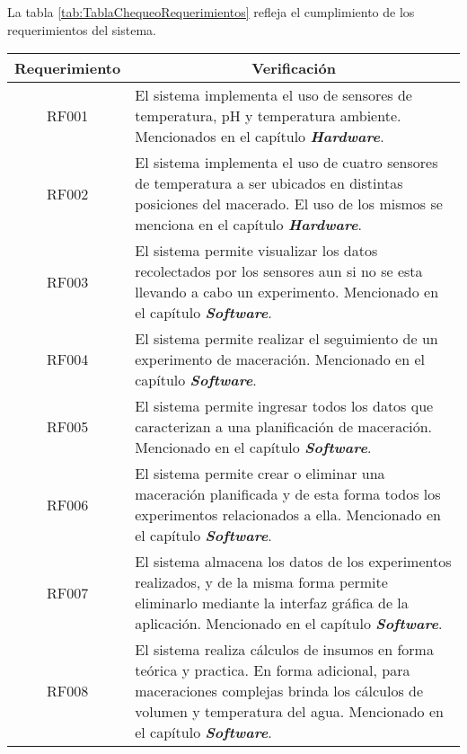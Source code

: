 \par La tabla \ref{tab:TablaChequeoRequerimientos} refleja el cumplimiento de los requerimientos del sistema.
 \begin{table}[h]
     \centering
     \begin{tabularx}{\textwidth}{|X|X|}
     \hline
     \multicolumn{1}{|c|}{Requerimiento} & \multicolumn{1}{|c|}{Verificación}\\
     \hline
     \hline
        \multicolumn{1}{|c|}{RF001}  & El sistema implementa el uso de sensores de temperatura, pH y temperatura ambiente. Mencionados en el capítulo \textit{\textbf{Hardware}}. \\
        \hline
        \multicolumn{1}{|c|}{RF002}  & El sistema implementa el uso de cuatro sensores de temperatura a ser ubicados en distintas posiciones del macerado. El uso de los mismos se menciona en el capítulo \textit{\textbf{Hardware}}. \\
        \hline
        \multicolumn{1}{|c|}{RF003}  & El sistema permite visualizar los datos recolectados por los sensores aun si no se esta llevando a cabo un experimento. Mencionado en el capítulo \textit{\textbf{Software}}. \\
        \hline
        \multicolumn{1}{|c|}{RF004}  & El sistema permite realizar el seguimiento de un experimento de maceración.  Mencionado en el capítulo \textit{\textbf{Software}}.   \\
        \hline
        \multicolumn{1}{|c|}{RF005}  & El sistema permite ingresar todos los datos que caracterizan a una planificación de maceración. Mencionado en el capítulo \textit{\textbf{Software}}.  \\
        \hline
        \multicolumn{1}{|c|}{RF006}  & El sistema permite crear o eliminar una maceración planificada y de esta forma todos los experimentos relacionados a ella. Mencionado en el capítulo \textit{\textbf{Software}}. \\
        \hline
        \multicolumn{1}{|c|}{RF007}  & El sistema almacena los datos de los experimentos realizados, y de la misma forma permite eliminarlo mediante la interfaz gráfica de la aplicación. Mencionado en el capítulo \textit{\textbf{Software}}. \\
        \hline
        \multicolumn{1}{|c|}{RF008}  & El sistema realiza cálculos de insumos en forma teórica y practica. En forma adicional, para maceraciones complejas brinda los cálculos de volumen y temperatura del agua. Mencionado en el capítulo \textit{\textbf{Software}}. \\

\end{tabularx}
\end{table}
